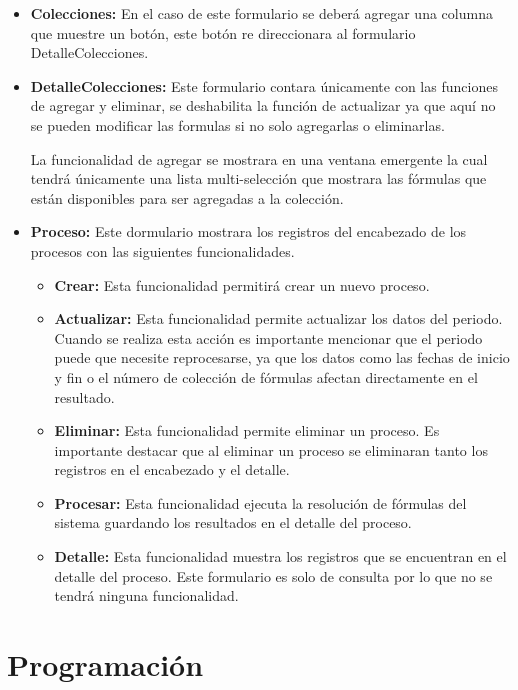 		\begin{itemize}
			\item \textbf{Colecciones:} En el caso de este formulario se deber\'a agregar una columna que muestre un bot\'on, este bot\'on re direccionara al formulario DetalleColecciones.
			\item \textbf{DetalleColecciones:} Este formulario contara \'unicamente con las funciones de agregar y eliminar, se deshabilita la funci\'on de actualizar ya que aqu\'i no se pueden modificar las formulas si no solo agregarlas o eliminarlas. 

			La funcionalidad de agregar se mostrara en una ventana emergente la cual tendr\'a \'unicamente una lista multi-selecci\'on que mostrara las f\'ormulas que est\'an disponibles para ser agregadas a la colecci\'on.
			\item \textbf{Proceso:} Este dormulario mostrara los registros del encabezado de los procesos con las siguientes funcionalidades.
			\begin{itemize}
				\item \textbf{Crear:} Esta funcionalidad permitir\'a crear un nuevo proceso.
				\item \textbf{Actualizar:} Esta funcionalidad permite actualizar los datos del periodo. Cuando se realiza esta acci\'on es importante mencionar que el periodo puede que necesite reprocesarse, ya que los datos como las fechas de inicio y fin o el n\'umero de colecci\'on de f\'ormulas afectan directamente en el resultado.
				\item \textbf{Eliminar:} Esta funcionalidad permite eliminar un proceso. Es importante destacar que al eliminar un proceso se eliminaran tanto los registros en el encabezado y el detalle.
				\item \textbf{Procesar:} Esta funcionalidad ejecuta la resoluci\'on de f\'ormulas del sistema guardando los resultados en el detalle del proceso.
				\item \textbf{Detalle:} Esta funcionalidad muestra los registros que se encuentran en el detalle del proceso. Este formulario es solo de consulta por lo que no se tendr\'a ninguna funcionalidad.
			\end{itemize}
		\end{itemize}



	\section{Programaci\'on}

